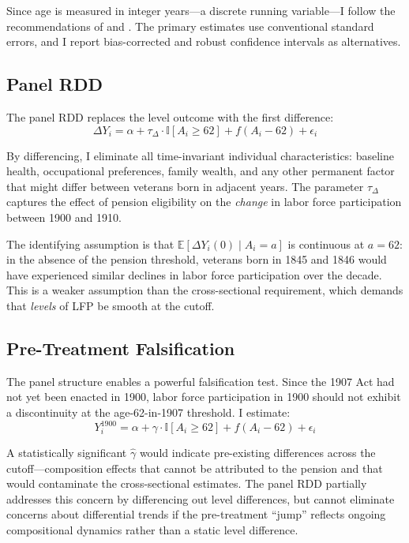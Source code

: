 \documentclass[12pt]{article}
\newcommand{\E}{\mathbb{E}}
\newcommand{\ind}{\mathbb{I}}
\begin{document}
Since age is measured in integer years---a discrete running variable---I follow the recommendations of \citet{cattaneo2020practical} and \citet{LeeCard2008}. The primary estimates use conventional standard errors, and I report bias-corrected and robust confidence intervals as alternatives.

\subsection{Panel RDD}

The panel RDD replaces the level outcome with the first difference:
\begin{equation}
\Delta Y_i = \alpha + \tau_\Delta \cdot \ind[A_i \geq 62] + f(A_i - 62) + \epsilon_i
\end{equation}

By differencing, I eliminate all time-invariant individual characteristics: baseline health, occupational preferences, family wealth, and any other permanent factor that might differ between veterans born in adjacent years. The parameter $\tau_\Delta$ captures the effect of pension eligibility on the \textit{change} in labor force participation between 1900 and 1910.

The identifying assumption is that $\E[\Delta Y_i(0) \mid A_i = a]$ is continuous at $a = 62$: in the absence of the pension threshold, veterans born in 1845 and 1846 would have experienced similar declines in labor force participation over the decade. This is a weaker assumption than the cross-sectional requirement, which demands that \textit{levels} of LFP be smooth at the cutoff.

\subsection{Pre-Treatment Falsification}

The panel structure enables a powerful falsification test. Since the 1907 Act had not yet been enacted in 1900, labor force participation in 1900 should not exhibit a discontinuity at the age-62-in-1907 threshold. I estimate:
\begin{equation}
Y_i^{1900} = \alpha + \gamma \cdot \ind[A_i \geq 62] + f(A_i - 62) + \epsilon_i
\end{equation}

A statistically significant $\hat{\gamma}$ would indicate pre-existing differences across the cutoff---composition effects that cannot be attributed to the pension and that would contaminate the cross-sectional estimates. The panel RDD partially addresses this concern by differencing out level differences, but cannot eliminate concerns about differential trends if the pre-treatment ``jump'' reflects ongoing compositional dynamics rather than a static level difference.
\end{document}
